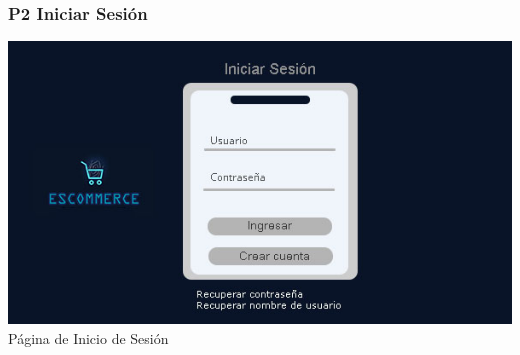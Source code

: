 \documentclass[14pt]{article}
\begin{document}
            \subsubsection{P2 Iniciar Sesión}\label{P2 Iniciar Sesión}
                \begin{center}
                    \includegraphics[height=0.55\textwidth]{IniciarSesion.jpg}
                    \label{fig:IniciarSesion} \\ [Figura 3] Página de Inicio de Sesión
                \end{center}
\end{document}
